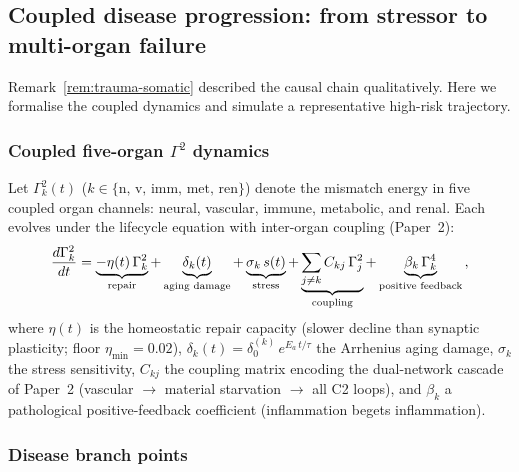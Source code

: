 \documentclass[aps,pre,twocolumn,superscriptaddress,floatfix]{revtex4-2}
\begin{document}
\subsection{Coupled disease progression:
from stressor to multi-organ failure}
\label{sec:disease-progression}

Remark~\ref{rem:trauma-somatic} described the causal chain
qualitatively.
Here we formalise the coupled dynamics and simulate a
representative high-risk trajectory.

\subsubsection{Coupled five-organ $\Gamma^2$ dynamics}

Let $\Gamma_k^2(t)$ ($k \in \{\text{n, v, imm, met, ren}\}$)
denote the mismatch energy in five coupled organ channels:
neural, vascular, immune, metabolic, and renal.
Each evolves under the lifecycle equation with
inter-organ coupling (Paper~2):
\begin{equation}
  \frac{d\Gamma_k^2}{dt}
  = \underbrace{-\eta(t)\,\Gamma_k^2}_{\text{repair}}
  + \underbrace{\delta_k(t)\vphantom{\Gamma_k^2}}_{\text{aging damage}}
  + \underbrace{\sigma_k\,s(t)}_{\text{stress}}
  + \underbrace{\sum_{j \neq k}
    C_{kj}\,\Gamma_j^2}_{\text{coupling}}
  + \underbrace{\beta_k\,\Gamma_k^4}_{\text{positive feedback}}\,,
  \label{eq:coupled-G2}
\end{equation}
where $\eta(t)$ is the homeostatic repair capacity
(slower decline than synaptic plasticity; floor
$\eta_{\min} = 0.02$),
$\delta_k(t) = \delta_0^{(k)}\,e^{E_a\,t/\tau}$ the
Arrhenius aging damage,
$\sigma_k$ the stress sensitivity,
$C_{kj}$ the coupling matrix encoding the dual-network
cascade of Paper~2 (vascular $\to$ material starvation
$\to$ all C2 loops), and
$\beta_k$ a pathological positive-feedback coefficient
(inflammation begets inflammation).

\subsubsection{Disease branch points}
\end{document}
